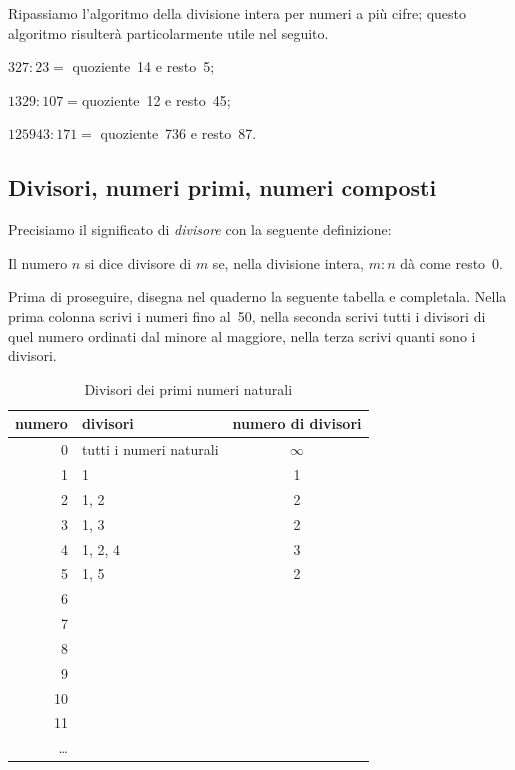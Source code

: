 Ripassiamo l'algoritmo della divisione intera per numeri a più cifre; questo 
algoritmo risulterà particolarmente utile nel seguito.

\vspace{-6pt}
\begin{center}
\begin{inaccessibleblock}
 
\end{inaccessibleblock}
\end{center}
\vspace{-12pt}

\begin{enumeratea}
 \item $327:23=$ quoziente~14 e resto~5;
 \item $1329:107=$quoziente~12 e resto~45;
 \item $125943:171=$ quoziente~736 e resto~87.
\end{enumeratea}

\subsection{Divisori, numeri primi, numeri composti}

Precisiamo il significato di \emph{divisore} con la seguente definizione:

\begin{definizione}
 Il numero $n$ si dice divisore di $m$ se, nella divisione intera, 
 $m : n$ dà come resto~0.
\end{definizione}

Prima di proseguire, disegna nel quaderno la seguente tabella e completala.  
Nella prima colonna scrivi i numeri fino al~50, nella seconda scrivi tutti 
i divisori di quel numero ordinati dal minore al maggiore, nella terza 
scrivi quanti sono i divisori.

\begin{table}[h]
\centering
\caption{Divisori dei primi numeri naturali}
\begin{tabular}{|r|p{6cm}|c|}
\hline
\textsf{\relax 
numero
} & \textsf{\relax 
          divisori          
} & \textsf{\relax 
numero di divisori
}\\
\hline
0 & tutti i numeri naturali & $\infty$\\
\hline
1 & 1 & 1\\
\hline
2 & 1, 2 & 2\\
\hline
3 & 1, 3 & 2\\
\hline
4 & 1, 2, 4 & 3\\
\hline
5 & 1, 5 & 2\\
\hline
6 &  & \\
\hline
7 &  & \\
\hline
8 &  & \\
\hline
9 &  & \\
\hline
10 &  & \\
\hline
11 &  & \\
\hline
\dots &  & \\
\hline
\end{tabular}
\end{table}


